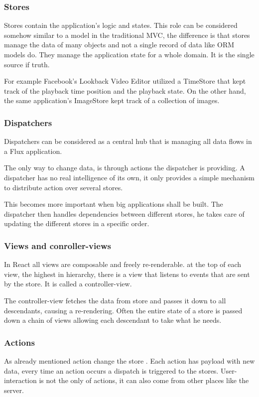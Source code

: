 \subsubsection{Stores}
Stores contain the application's logic and states. This role can be considered somehow similar to a model in the traditional MVC, the difference is that stores manage the data of many objects and not a single record of data like ORM models do. They manage the application state for a whole domain. It is the single source if truth.

For example Facebook's Lookback Video Editor utilized a TimeStore that kept track of the playback time position and the playback state. On the other hand, the same application's ImageStore kept track of a collection of images.


\subsubsection{Dispatchers}
Dispatchers can be considered as a central hub that is managing all data flows in a Flux application.

The only way to change data, is through actions the dispatcher is providing.
A dispatcher has no real intelligence of its own, it only provides a simple mechanism to distribute action over several stores.

This becomes more important when big applications shall be built. The dispatcher then handles dependencies between different stores, he takes care of updating the different stores in a specific order.


\subsubsection{Views and conroller-views}

In React all views are composable and freely re-renderable. at the top of each view, the highest in hierarchy, there is a view that listens to events that are sent by the store. It is called a controller-view. 

The controller-view fetches the data from store and passes it down to all descendants, causing a re-rendering. Often the entire state of a store is passed down a chain of views allowing each descendant to take what he needs.

\subsubsection{Actions}
As already mentioned action change the store . Each action has payload with new data, every time an action occurs a dispatch is triggered to the stores. User-interaction is not the only of actions, it can also come from other places like the server.


